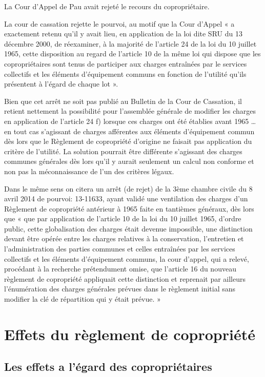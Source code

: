 				La Cour d’Appel de Pau avait rejeté le recours du copropriétaire.
				
				La cour de cassation rejette le pourvoi, au motif que la Cour d’Appel « a exactement retenu qu'il y avait lieu, en application de la loi dite SRU du 13 décembre 2000, de réexaminer, à la majorité de l'article 24 de la loi du 10 juillet 1965, cette disposition au regard de l'article 10 de la même loi qui dispose que les copropriétaires sont tenus de participer aux charges entraînées par le services collectifs et les éléments d'équipement communs en fonction de l'utilité qu'ils présentent à l'égard de chaque lot ».
				
				Bien que cet arrêt ne soit pas publié au Bulletin de la Cour de Cassation, il retient nettement la possibilité pour l’assemblée générale de modifier les charges en application de l’article 24 f) lorsque ces charges ont été établies avant 1965 … en tout cas s’agissant de charges afférentes aux éléments d’équipement commun dès lors que le Règlement de copropriété d’origine ne faisait pas application du critère de l’utilité. La solution pourrait être différente s’agissant des charges communes générales dès lors qu’il y aurait seulement un calcul non conforme et non pas la méconnaissance de l’un des critères légaux.
				
				Dans le même sens on citera un arrêt (de rejet) de la 3ème chambre civile du 8 avril 2014 \no de pourvoi: 13-11633, ayant validé une ventilation des charges d’un Règlement de copropriété antérieur à 1965 faite en tantièmes généraux, dès lors que « que par application de l'article 10 de la loi du 10 juillet 1965, d'ordre public, cette globalisation des charges était devenue impossible, une distinction devant être opérée entre les charges relatives à la conservation, l'entretien et l'administration des parties communes et celles entraînées par les services collectifs et les éléments d'équipement communs, la cour d'appel, qui a relevé, procédant à la recherche prétendument omise, que l'article 16 du nouveau règlement de copropriété appliquait cette distinction et reprenait par ailleurs l'énumération des charges générales prévues dans le règlement initial sans modifier la clé de répartition qui y était prévue. » 
	
\section{Effets du règlement de copropriété}
	
	\subsection{Les effets a l'égard des copropriétaires}
	

